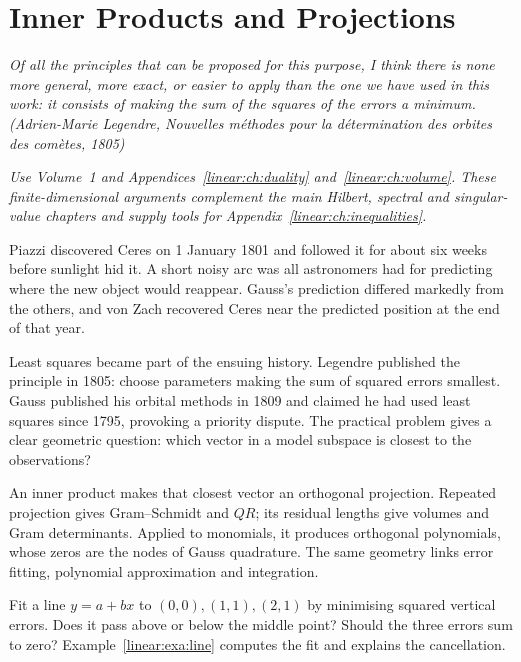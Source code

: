 \chapter{Inner Products and Projections}\label{linear:ch:inner}

\begin{center}\itshape
Of all the principles that can be proposed for this purpose, I think there is none more general, more exact, or easier
to apply than the one we have used in this work: it consists of making the sum of the squares of the errors a minimum.
\upshape(Adrien-Marie Legendre, \emph{Nouvelles m\'ethodes pour la d\'etermination des orbites des com\`etes}, 1805)
\end{center}
\noindent\emph{Use Volume~1 and Appendices~\ref{linear:ch:duality} and~\ref{linear:ch:volume}. These finite-dimensional arguments complement the main Hilbert, spectral and singular-value chapters and supply tools for Appendix~\ref{linear:ch:inequalities}.}

Piazzi discovered Ceres on 1 January 1801 and followed it for about six weeks before sunlight hid it. A short noisy arc was all astronomers had for predicting where the new object would reappear. Gauss's prediction differed markedly from the others, and von Zach recovered Ceres near the predicted position at the end of that year.

Least squares became part of the ensuing history. Legendre published the principle in 1805: choose parameters making the sum of squared errors smallest. Gauss published his orbital methods in 1809 and claimed he had used least squares since 1795, provoking a priority dispute. The practical problem gives a clear geometric question: which vector in a model subspace is closest to the observations?

An inner product makes that closest vector an orthogonal projection. Repeated projection gives Gram--Schmidt and $QR$; its residual lengths give volumes and Gram determinants. Applied to monomials, it produces orthogonal polynomials, whose zeros are the nodes of Gauss quadrature. The same geometry links error fitting, polynomial approximation and integration.

\begin{think}
Fit a line $y=a+bx$ to $(0,0),(1,1),(2,1)$ by minimising squared vertical errors. Does it pass above or below the middle point? Should the three errors sum to zero? Example~\ref{linear:exa:line} computes the fit and explains the cancellation.
\end{think}


